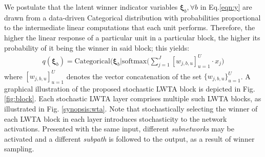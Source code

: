 \documentclass{article}
\begin{document}
	We postulate that the latent winner indicator variables $\boldsymbol \xi_b, \forall b$ in Eq.\eqref{eqn:y} are drawn from a data-driven Categorical distribution with probabilities proportional to the intermediate linear computations that each unit performs. Therefore, the higher the linear response of a particular unit in a particular block, the higher its probability of it being the winner in said block; this yields:
\begin{align}
			q(\boldsymbol \xi_b) = \mathrm{Categorical}\Big( \boldsymbol \xi_b \Big| \mathrm{softmax}\Big( \sum_{j=1}^J [w_{j,b,u}]_{u=1}^U \cdot  x_j \Big)
			\label{eqn:dense_q_xi}
		\end{align}
where $[w_{j,b,u}]_{u=1}^U$ denotes the vector concatenation of the set $\{w_{j,b,u}\}_{u=1}^U$. A graphical illustration of the proposed stochastic LWTA block is depicted in Fig. \ref{fig:block}. Each stochastic LWTA layer comprises multiple such LWTA blocks, as illustrated in Fig. \ref{synopsis:wta}. Note that stochastically selecting the winner of each LWTA block in each layer introduces stochasticity to the network activations. Presented with the same input, different \textit{subnetworks} may be activated and a different \textit{subpath} is followed to the output, as a result of winner sampling.
\end{document}
